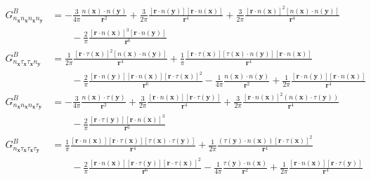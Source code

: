\documentclass[preprint,12pt,3p]{elsarticle}
\begin{document}
\begin{align}
    G^{B}_{n_\mathbf{x} n_\mathbf{x} n_\mathbf{x} n_\mathbf{y}} &= -\frac{3}{4\pi} \frac{ n(\mathbf{x}) \cdot  n(\mathbf{y}) }{\pmb{r}^2} + \frac{3}{2\pi} \frac{[\pmb{r}\cdot  n(\mathbf{y}) ][\pmb{r}\cdot  n(\mathbf{x}) ]}{\pmb{r}^4}+ \frac{3}{2\pi} \frac{[\pmb{r}\cdot  n(\mathbf{x}) ]^2 [ n(\mathbf{x})  \cdot  n(\mathbf{y}) ]}{\pmb{r}^4} \nonumber \\
    &\qquad -\frac{2}{\pi} \frac{[\pmb{r} \cdot n(\mathbf{x})]^3[\pmb{r}\cdot n(\mathbf{y})]}{\pmb{r}^6} \\
    G^{B}_{n_\mathbf{x} \tau_\mathbf{x} \tau_\mathbf{x}  n_\mathbf{y}} &= \frac{1}{2\pi} \frac{[\pmb{r} \cdot \tau(\mathbf{x})]^2 [ n(\mathbf{x})  \cdot  n(\mathbf{y}) ]}{\pmb{r}^4} + \frac{1}{\pi} \frac{[\pmb{r}\cdot \tau(\mathbf{x}) ][\tau(\mathbf{x})\cdot  n(\mathbf{y}) ] [\pmb{r} \cdot  n(\mathbf{x}) ] }{\pmb{r}^4} \nonumber \\
    &\qquad - \frac{2}{\pi} \frac{[\pmb{r} \cdot  n(\mathbf{y}) ][\pmb{r} \cdot  n(\mathbf{x}) ] [\pmb{r} \cdot \tau(\mathbf{x})]^2 }{\pmb{r}^6} -\frac{1}{4\pi} \frac{ n(\mathbf{x})  \cdot  n(\mathbf{y}) }{\pmb{r}^2 }+ \frac{1}{2\pi} \frac{[\pmb{r} \cdot  n(\mathbf{y}) ][\pmb{r} \cdot  n(\mathbf{x}) ]}{\pmb{r}^4}\\
     G^{B}_{n_\mathbf{x} n_\mathbf{x} n_\mathbf{x} \tau_\mathbf{y}} &= -\frac{3}{4\pi}\frac{ n(\mathbf{x})  \cdot  \tau(\mathbf{y}) }{\pmb{r}^2} + \frac{3}{2\pi} \frac{[\pmb{r}\cdot  n(\mathbf{x}) ][\pmb{r}\cdot  \tau(\mathbf{y}) ]}{\pmb{r}^4} + \frac{3}{2\pi} \frac{[\pmb{r}\cdot  n(\mathbf{x}) ]^2(  n(\mathbf{x})  \cdot  \tau(\mathbf{y}) )}{\pmb{r}^4} \nonumber \\
    &\qquad -\frac{2}{\pi}\frac{[\pmb{r}\cdot  \tau(\mathbf{y})  ][\pmb{r} \cdot  n(\mathbf{x}) ]^3}{\pmb{r}^6}\\
     G^{B}_{n_\mathbf{x} \tau_\mathbf{x} \tau_\mathbf{x} \tau_\mathbf{y} } &= \frac{1}{\pi} \frac{[\pmb{r}\cdot  n(\mathbf{x})  ][\pmb{r}\cdot \tau(\mathbf{x})] [\tau(\mathbf{x})\cdot  \tau(\mathbf{y}) ]}{\pmb{r}^4}+ \frac{1}{2\pi }\frac{( \tau(\mathbf{y})  \cdot  n(\mathbf{x}) ) [\pmb{r} \cdot \tau(\mathbf{x})]^2}{\pmb{r}^4} \nonumber \\
    &\qquad - \frac{2}{\pi} \frac{[\pmb{r}\cdot  n(\mathbf{x}) ][\pmb{r} \cdot  \tau(\mathbf{y}) ][\pmb{r} \cdot \tau(\mathbf{x})]^2}{\pmb{r}^6} - \frac{1}{4\pi} \frac{ \tau(\mathbf{y})  \cdot  n(\mathbf{x}) }{\pmb{r}^2} + \frac{1}{2\pi} \frac{[\pmb{r} \cdot  n(\mathbf{x}) ] [\pmb{r} \cdot  \tau(\mathbf{y})  ]}{\pmb{r}^4} 
\end{align}
\end{document}
